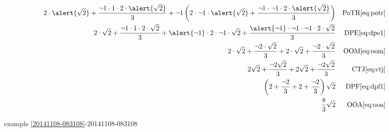\begin{example}[id:20141108-085327]
\begin{align*}
2 \cdot \alert{\sqrt{2}} + \dfrac{\neg 1 \cdot 1 \cdot 2 \cdot \alert{\sqrt{2}}}{3} + \neg 1 \left(2 \cdot \neg  1 \cdot \alert{\sqrt{2}} + \dfrac{\neg 1 \cdot \neg 1  \cdot 2 \cdot \alert{\sqrt{2}}}{3} \right) && \text{PoTR} \eqref{eq:potr} \\
2 \cdot \sqrt{2} + \dfrac{\neg 1 \cdot 1 \cdot 2 \cdot \sqrt{2}}{3} + \alert{\neg 1} \cdot 2 \cdot \neg  1 \cdot \sqrt{2} + \dfrac{\alert{\neg 1} \cdot \neg 1 \cdot \neg 1  \cdot 2 \cdot \sqrt{2}}{3}  && \text{DPE} \eqref{eq:dpe1} \\
2 \cdot \sqrt{2} + \dfrac{\neg 2 \cdot \sqrt{2}}{3} + 2 \cdot \sqrt{2} + \dfrac{\neg 2 \cdot \sqrt{2}}{3}  && \text{OOM} \eqref{eq:oom} \\
2\sqrt{2} + \dfrac{\neg 2\sqrt{2}}{3} + 2\sqrt{2} + \dfrac{\neg 2\sqrt{2}}{3} && \text{CTJ} \eqref{eq:ctj} \\
\left(2 + \dfrac{\neg 2}{3} + 2 + \dfrac{\neg 2}{3} \right)  \sqrt{2} && \text{DPF} \eqref{eq:dpf1} \\
\dfrac{8}{3}\sqrt{2} && \text{OOA} \eqref{eq:ooa} 
\end{align*}

\qdepend 

\qdependlist
example \ref{20141108-083108}-20141108-083108

\end{example}



